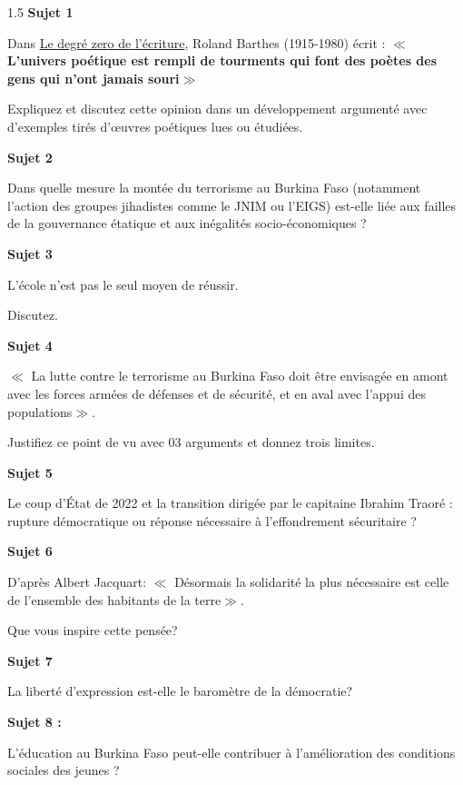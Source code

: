 \documentclass[12pt]{article}
\begin{document}
\begin{spacing}{1.5}
\textbf{Sujet 1}

Dans \underline{Le degré zero de l'écriture}, Roland Barthes (1915-1980) écrit : $\ll$ \textbf{L'univers poétique est rempli de tourments qui font des poètes des gens qui n'ont jamais souri}$\gg$

Expliquez et discutez cette opinion dans un développement argumenté avec d'exemples tirés d'œuvres poétiques lues ou étudiées.

\quad

\textbf{Sujet 2}

Dans quelle mesure la montée du terrorisme au Burkina Faso (notamment l'action des groupes jihadistes comme le JNIM ou l'EIGS) est-elle liée aux failles de la gouvernance étatique et aux inégalités socio-économiques ?


\quad
\textbf{Sujet 3}

L'école n'est pas le seul moyen de réussir.

Discutez.

\quad

\textbf{Sujet 4}

$\ll$ La lutte contre le terrorisme  au Burkina Faso doit être envisagée en amont avec les forces armées de défenses et de sécurité, et en aval avec l'appui des populations$\gg$.

Justifiez ce point de vu avec 03 arguments et donnez trois limites.

\quad

\textbf{Sujet 5}

Le coup d'État de 2022 et la transition dirigée par le capitaine Ibrahim Traoré : rupture démocratique ou réponse nécessaire à l'effondrement sécuritaire ?

\quad

\textbf{Sujet 6}

D'après Albert Jacquart: $\ll$ Désormais la solidarité la plus nécessaire est celle de l'ensemble des habitants de la terre$\gg$.

Que vous inspire cette pensée?

\quad

\textbf{Sujet 7}

La liberté d'expression est-elle le baromètre de la démocratie?


\quad
\quad

\textbf{Sujet 8 :}

L'éducation au Burkina Faso peut-elle contribuer à l'amélioration des conditions sociales des jeunes ?


\quad
\quad


\end{spacing}
\end{document}
